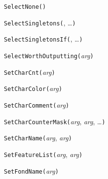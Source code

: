 
\texttt{SelectNone(}\texttt{)}



\texttt{SelectSingletons(}, \ldots\texttt{)}



\texttt{SelectSingletonsIf(}, \ldots\texttt{)}



\texttt{SelectWorthOutputting(}\textit{arg}\texttt{)}



\texttt{SetCharCnt(}\textit{arg}\texttt{)}



\texttt{SetCharColor(}\textit{arg}\texttt{)}



\texttt{SetCharComment(}\textit{arg}\texttt{)}



\texttt{SetCharCounterMask(}\textit{arg}, \textit{arg}, \ldots\texttt{)}



\texttt{SetCharName(}\textit{arg}, \textit{arg}\texttt{)}



\texttt{SetFeatureList(}\textit{arg}, \textit{arg}\texttt{)}



\texttt{SetFondName(}\textit{arg}\texttt{)}


